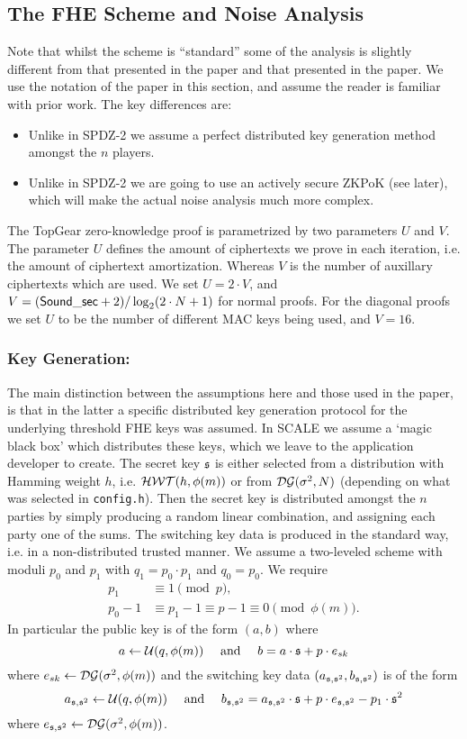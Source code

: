 \subsection{The FHE Scheme and Noise Analysis}
Note that whilst the scheme is ``standard'' some of the
analysis is slightly different from that presented in the \cite{SPDZ2} paper
and that presented in the \cite{GHS12c} paper.
We use the notation of the \cite{SPDZ2} paper in this section,
and assume the reader is familiar with prior work.
The key differences are:
\begin{itemize}
  \item Unlike in SPDZ-2 we assume a perfect distributed key generation method
        amongst the $n$ players.
  \item Unlike in SPDZ-2 we are going to use an actively secure ZKPoK (see later),
        which will make the actual noise analysis much more complex.
\end{itemize}
The TopGear zero-knowledge proof is parametrized by two
parameters $U$ and $V$.
The parameter $U$ defines the amount of ciphertexts we prove in
each iteration, i.e. the amount of ciphertext amortization.
Whereas $V$ is the number of auxillary ciphertexts which are used.
We set $U = 2 \cdot V$, and $V= (\mathsf{Sound\_sec}+2)/\log_2 (2 \cdot N+1)$
for normal proofs.
For the diagonal proofs we set $U$ to be the number of different
MAC keys being used, and $V=16$.


\subsubsection{Key Generation:}
The main distinction between the assumptions here and those used in
the \cite{SPDZ2} paper, is that in the latter a specific distributed
key generation protocol for the underlying threshold FHE keys was
assumed. In SCALE we assume a `magic black box' which distributes
these keys, which we leave to the application developer to create.
The secret key $\mathfrak{s}$ is either selected from a distribution with
Hamming weight $h$, i.e. $\mathcal{HWT}(h,\phi(m))$ or from
$\mathcal{DG}(\sigma^2,N)$ (depending on what was selected in \verb|config.h|).
Then the secret key is distributed amongst the $n$ parties by simply producing a random
linear combination, and assigning each party one of the sums.
The switching key data is produced in the standard way, i.e.
in a non-distributed trusted manner.
We assume a two-leveled scheme with moduli $p_0$ and $p_1$ with $q_1=p_0 \cdot p_1$
and $q_0=p_0$.
We require
\begin{align*}
  p_1     & \equiv 1 \pmod{p},                               \\
  p_0 - 1 & \equiv p_1-1 \equiv p-1 \equiv 0 \pmod{\phi(m)}.
\end{align*}
In particular the public key is of the form $(a,b)$ where
\[ a \leftarrow \mathcal{U}(q,\phi(m)) \quad \mbox{ and } \quad b = a \cdot \mathfrak{s} + p \cdot e_{sk} \]
where $e_{sk} \leftarrow \mathcal{DG}(\sigma^2,\phi(m))$
and the switching key data $(a_{\mathfrak{s},\mathfrak{s}^2},b_{\mathfrak{s},\mathfrak{s}^2})$ is of the form
\[ a_{\mathfrak{s},\mathfrak{s}^2} \leftarrow \mathcal{U}(q,\phi(m)) \quad \mbox{ and } \quad
  b_{\mathfrak{s},\mathfrak{s}^2} =   a_{\mathfrak{s},\mathfrak{s}^2} \cdot \mathfrak{s} + p \cdot e_{\mathfrak{s},\mathfrak{s}^2} - p_1 \cdot \mathfrak{s}^2 \]
where $e_{\mathfrak{s},\mathfrak{s}^2} \leftarrow \mathcal{DG}(\sigma^2,\phi(m))$.



